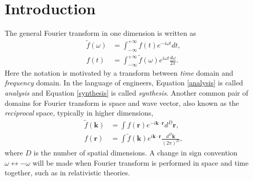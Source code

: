 \documentclass[
10pt, %
a4paper, %
oneside, %
headinclude,footinclude, %
BCOR5mm, %
]{scrartcl}
\begin{document}
\section{Introduction}
The general Fourier transform in one dimension is written as
\begin{align}
\label{analysis}\tilde{f}(\omega) &= \int_{-\infty}^{+\infty} f(t) e^{-i\omega t}dt, \\
\label{synthesis}f(t) &= \int_{-\infty}^{+\infty} \tilde{f}(\omega)e^{i\omega t}\frac{d\omega}{2\pi}.
\end{align}
Here the notation is motivated by a transform between \textit{time} domain and \textit{frequency} domain. In the language of engineers, Equation \ref{analysis} is called \textit{analysis} and Equation \ref{synthesis} is called \textit{synthesis}. Another common pair of domains for Fourier transform is space and wave vector, also known as the \textit{reciprocal} space, typically in higher dimensions,
\begin{align}
\tilde{f}(\mathbf{k}) &= \int f(\mathbf{r}) e^{-i\mathbf{k}\cdot \mathbf{r}}d^D \mathbf{r}, \\
f(\mathbf{r}) &= \int \tilde{f}(\mathbf{k}) e^{i\mathbf{k}\cdot \mathbf{r}} \frac{d^D\mathbf{k}}{(2\pi)^D},
\end{align}
where $D$ is the number of spatial dimensions. A change in sign convention $\omega \longleftrightarrow -\omega$ will be made when Fourier transform is performed in space and time together, such as in relativistic theories.
\end{document}

